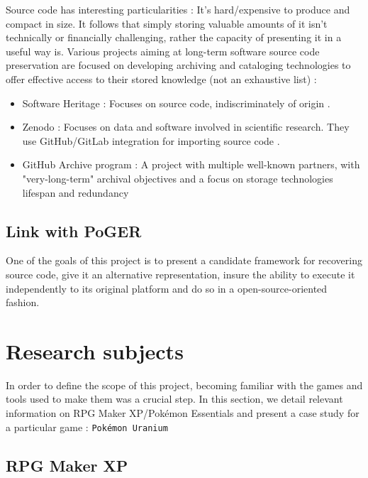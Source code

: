\documentclass[11pt]{article}
\begin{document}
Source code has interesting particularities : It's hard/expensive to produce and compact in size. It follows that simply storing valuable amounts of it isn't technically or financially challenging, rather the capacity of presenting it in a useful way is. Various projects aiming at long-term software source code preservation are focused on developing archiving and cataloging technologies to offer effective access to their stored knowledge (not an exhaustive list) :

\begin{itemize}
	
	\item Software Heritage : Focuses on source code, indiscriminately of origin \cite{di2017software,softheri}.
	
	\item Zenodo : Focuses on data and software involved in scientific research. They use GitHub/GitLab integration for importing source code \cite{zenodo}.
	
	\item GitHub Archive program : A project with multiple well-known partners, with "very-long-term" archival objectives and a focus on storage technologies lifespan and redundancy \cite{githubap}
	
\end{itemize}




\subsection{Link with PoGER}

One of the goals of this project is to present a candidate framework for recovering source code, give it an alternative representation, insure the ability to execute it independently to its original platform and do so in a open-source-oriented fashion.




\newpage
\section{Research subjects}

In order to define the scope of this project, becoming familiar with the games and tools used to make them was a crucial step. In this section, we detail relevant information on RPG Maker XP/Pokémon Essentials and present a case study for a particular game : \texttt{Pokémon Uranium}

\subsection{RPG Maker XP}
\end{document}
